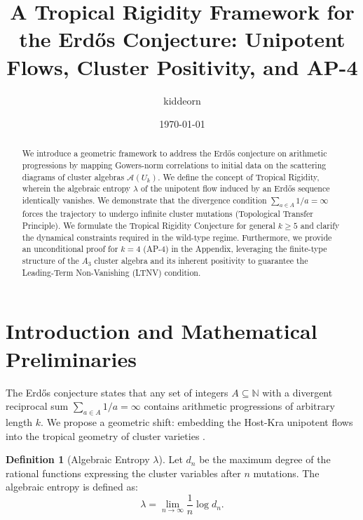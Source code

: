 \documentclass[11pt, a4paper, reqno]{amsart}
\theoremstyle{definition}
\newtheorem{definition}[theorem]{Definition}
\newcommand{\N}{\mathbb{N}}
\begin{document}
\title[Tropical Rigidity for the Erd\H{o}s Conjecture]{A Tropical Rigidity Framework for the Erd\H{o}s Conjecture: Unipotent Flows, Cluster Positivity, and AP-4}

\author{kiddeorn}
\date{\today}

\begin{abstract}
We introduce a geometric framework to address the Erd\H{o}s conjecture on arithmetic progressions by mapping Gowers-norm correlations to initial data on the scattering diagrams of cluster algebras $\mathcal{A}(U_k)$. We define the concept of Tropical Rigidity, wherein the algebraic entropy $\lambda$ of the unipotent flow induced by an Erd\H{o}s sequence identically vanishes. We demonstrate that the divergence condition $\sum_{a \in A} 1/a = \infty$ forces the trajectory to undergo infinite cluster mutations (Topological Transfer Principle). We formulate the Tropical Rigidity Conjecture for general $k \ge 5$ and clarify the dynamical constraints required in the wild-type regime. Furthermore, we provide an unconditional proof for $k=4$ (AP-4) in the Appendix, leveraging the finite-type structure of the $A_3$ cluster algebra and its inherent positivity to guarantee the Leading-Term Non-Vanishing (LTNV) condition.
\end{abstract}

\maketitle

\section{Introduction and Mathematical Preliminaries}
The Erd\H{o}s conjecture states that any set of integers $A \subseteq \N$ with a divergent reciprocal sum $\sum_{a \in A} 1/a = \infty$ contains arithmetic progressions of arbitrary length $k$. We propose a geometric shift: embedding the Host-Kra unipotent flows \cite{HostKra2005} into the tropical geometry of cluster varieties \cite{FominZelevinsky2002}.

\begin{definition}[Algebraic Entropy $\lambda$]
Let $d_n$ be the maximum degree of the rational functions expressing the cluster variables after $n$ mutations. The algebraic entropy is defined as:
\begin{equation}
    \lambda = \lim_{n \to \infty} \frac{1}{n} \log d_n.
\end{equation}
\end{definition}
\end{document}
